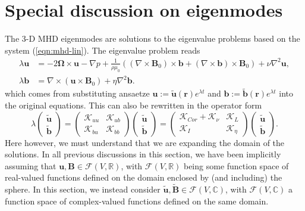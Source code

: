 \section{Special discussion on eigenmodes}

The 3-D MHD eigenmodes are solutions to the eigenvalue problems based on the system (\ref{eqn:mhd-lin}). The eigenvalue problem reads
%
\begin{equation}\label{eqn:mhd-eigen}
\begin{aligned}
    \lambda \mathbf{u} &= - 2 \boldsymbol{\Omega}\times \mathbf{u} - \nabla p + \frac{1}{\rho \mu_0} \left((\nabla\times \mathbf{B}_0)\times \mathbf{b} + (\nabla\times \mathbf{b})\times \mathbf{B}_0\right) + \nu \nabla^2 \mathbf{u}, \\ 
    \lambda \mathbf{b} &= \nabla\times (\mathbf{u}\times \mathbf{B}_0) + \eta \nabla^2 \mathbf{b}.
\end{aligned}
\end{equation}
%
which comes from substituting ansaetze $\mathbf{u} := \tilde{\mathbf{u}}(\mathbf{r}) e^{\lambda t}$ and $\mathbf{b} := \tilde{\mathbf{b}}(\mathbf{r}) e^{\lambda t}$ into the original equations. This can also be rewritten in the operator form
%
\begin{equation}
    \lambda \begin{pmatrix} \tilde{\mathbf{u}} \\ \tilde{\mathbf{b}} \end{pmatrix} = 
    \begin{pmatrix}
        \mathcal{K}_{uu} & \mathcal{K}_{ub} \\ 
        \mathcal{K}_{bu} & \mathcal{K}_{bb}
    \end{pmatrix}
    \begin{pmatrix} \tilde{\mathbf{u}} \\ \tilde{\mathbf{b}} \end{pmatrix} = 
    \begin{pmatrix}
        \mathcal{K}_{Cor} + \mathcal{K}_\nu & \mathcal{K}_{L} \\ 
        \mathcal{K}_{I} & \mathcal{K}_{\eta}
    \end{pmatrix}
    \begin{pmatrix} \tilde{\mathbf{u}} \\ \tilde{\mathbf{b}} \end{pmatrix}.
\end{equation}
%
Here however, we must understand that we are expanding the domain of the solutions. In all previous discussions in this section, we have been implicitly assuming that $\mathbf{u}, \mathbf{B} \in \mathcal{F}(V, \mathbb{R})$, with $\mathcal{F}(V, \mathbb{R})$ being some function space of real-valued functions defined on the domain enclosed by (and including) the sphere. In this section, we instead consider $\tilde{\mathbf{u}}, \tilde{\mathbf{B}} \in \mathcal{F}(V, \mathbb{C})$, with $\mathcal{F}(V, \mathbb{C})$ a function space of complex-valued functions defined on the same domain.

